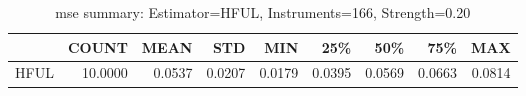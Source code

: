 \begin{table}[ht]
\centering
\caption{mse summary: Estimator=HFUL, Instruments=166, Strength=0.20}
\begin{tabular}{lrrrrrrrr}
\toprule
 & COUNT & MEAN & STD & MIN & 25\% & 50\% & 75\% & MAX \\
\midrule
HFUL & 10.0000 & 0.0537 & 0.0207 & 0.0179 & 0.0395 & 0.0569 & 0.0663 & 0.0814 \\
\bottomrule
\end{tabular}
\end{table}
